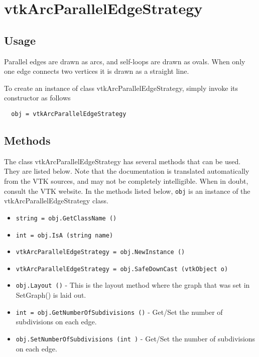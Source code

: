 \section{vtkArcParallelEdgeStrategy}

\subsection{Usage}

 Parallel edges are drawn as arcs, and self-loops are drawn as ovals.
 When only one edge connects two vertices it is drawn as a straight line.

To create an instance of class vtkArcParallelEdgeStrategy, simply
invoke its constructor as follows
\begin{verbatim}
  obj = vtkArcParallelEdgeStrategy
\end{verbatim}
\subsection{Methods}

The class vtkArcParallelEdgeStrategy has several methods that can be used.
  They are listed below.
Note that the documentation is translated automatically from the VTK sources,
and may not be completely intelligible.  When in doubt, consult the VTK website.
In the methods listed below, \verb|obj| is an instance of the vtkArcParallelEdgeStrategy class.
\begin{itemize}
\item  \verb|string = obj.GetClassName ()|

\item  \verb|int = obj.IsA (string name)|

\item  \verb|vtkArcParallelEdgeStrategy = obj.NewInstance ()|

\item  \verb|vtkArcParallelEdgeStrategy = obj.SafeDownCast (vtkObject o)|

\item  \verb|obj.Layout ()| -  This is the layout method where the graph that was
 set in SetGraph() is laid out.

\item  \verb|int = obj.GetNumberOfSubdivisions ()| -  Get/Set the number of subdivisions on each edge.

\item  \verb|obj.SetNumberOfSubdivisions (int )| -  Get/Set the number of subdivisions on each edge.

\end{itemize}

